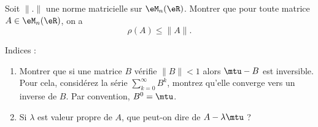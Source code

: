\begin{exercice}\label{exoGeomAnal-0044}

Soit $\|.\|$ une norme matricielle sur $\eM_n(\eR)$. Montrer que pour toute matrice $A\in \eM_n(\eR)$, on a 
\begin{equation}
    \rho(A)\le\|A\|.
\end{equation}

Indices : 
\begin{enumerate}
    \item Montrer que si une matrice $B$ vérifie $\|B\|<1$ alors $\mtu-B$ est inversible. Pour cela, considérez la série \( \sum_{k=0}^{\infty}B^k\), montrez qu'elle converge vers un inverse de \( B\). Par convention, \( B^0=\mtu\).
\item Si $\lambda$ est valeur propre de $A$, que peut-on dire de $A-\lambda \mtu$ ?
\end{enumerate}

\end{exercice}
